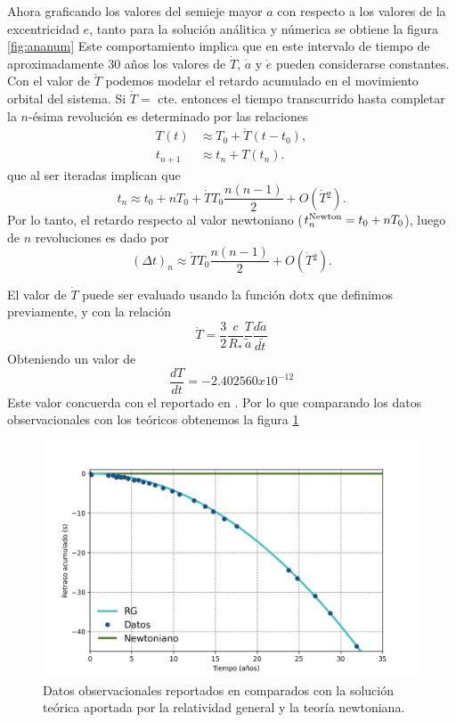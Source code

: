 Ahora graficando los valores del semieje mayor $a$ con respecto a los valores de la excentricidad $e$, tanto para la solución análitica y númerica se obtiene la figura
\ref{fig:ananum}
Este comportamiento implica que en este intervalo de tiempo de aproximadamente 30 años los valores de $\dot{T}$, $\dot{a}$ y $\dot{e}$ pueden considerarse constantes. Con el valor de $\dot{T}$ podemos modelar el retardo acumulado en el movimiento orbital del sistema. Si $\dot{T}=$ cte. entonces el tiempo transcurrido hasta completar la $n$-ésima revolución es determinado por las relaciones
\begin{align*}
T(t)&\approx T_0 + \dot{T}(t-t_0),\\
t_{n+1}& \approx t_n + T(t_n).
\end{align*}
que al ser iteradas implican que
\begin{equation*}
t_n \approx t_0+nT_0+\dot{T}T_0\frac{n(n-1)}{2}+O(\dot{T}{}^2).
\end{equation*}
Por lo tanto, el retardo respecto al valor newtoniano ($t_n^{\rm Newton}=t_0+nT_0$), luego de $n$ revoluciones es dado por
\begin{equation*}
(\Delta t)_n \approx \dot{T}T_0\frac{n(n-1)}{2}+O(\dot{T}{}^2).
\end{equation*}

El valor de $\dot{T}$ puede ser evaluado usando la función \textcolor{def}{dotx} que definimos previamente, y con la relación
\begin{equation*}
\dot{T}=\frac{3}{2}\frac{c}{R_\ast}\frac{T}{\tilde{a}}\frac{d\tilde{a}}{d\tilde{t}}
\end{equation*}
Obteniendo un valor de 
\begin{equation*}
    \frac{dT}{dt}=-2.402560x10^{-12}
\end{equation*}
Este valor concuerda con el reportado en \cite{Weisberg2010}. Por lo que comparando los datos observacionales con los teóricos obtenemos la figura \ref{fig:exp}
\begin{figure}[H]
    \centering
    \includegraphics[scale=0.70]{images/exp.png}
    \caption{Datos observacionales reportados en \cite{Weisberg2010} comparados con la solución teórica aportada por la relatividad general y la teoría newtoniana.}
    \label{fig:exp}
\end{figure}